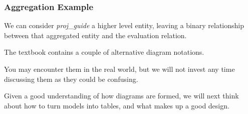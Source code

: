 \begin{frame}
\frametitle{Aggregation Example}

We can consider \textit{proj\_guide} a higher level entity,  leaving a binary relationship between that aggregated entity and the evaluation relation.

The textbook contains a couple of alternative diagram notations. 

You may encounter them in the real world, but we will not invest any time discussing them as they could be confusing.

Given a good understanding of how diagrams are formed, we will next think about how to turn models into tables, and what makes up a good design.



\end{frame}





